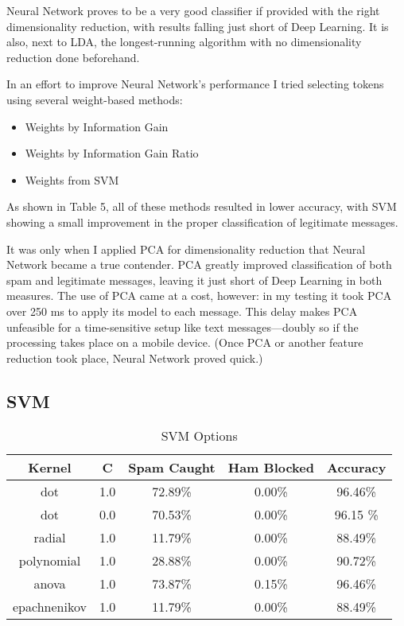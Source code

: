 \documentclass[10pt,journal,compsoc]{IEEEtran}
\begin{document}
Neural Network proves to be a very good classifier if provided with the right dimensionality reduction, with results falling just short of Deep Learning. It is also, next to LDA, the longest-running algorithm with no dimensionality reduction done beforehand.

In an effort to improve Neural Network's performance I tried selecting tokens using several weight-based methods: 

\begin{itemize}
    \item Weights by Information Gain
    \item Weights by Information Gain Ratio
    \item Weights from SVM
\end{itemize}

As shown in Table 5, all of these methods resulted in lower accuracy, with SVM showing a small improvement in the proper classification of legitimate messages.

It was only when I applied PCA for dimensionality reduction that Neural Network became a true contender. PCA greatly improved classification of both spam and legitimate messages, leaving it just short of Deep Learning in both measures. The use of PCA came at a cost, however: in my testing it took PCA over 250 ms to apply its model to each message. This delay makes PCA unfeasible for a time-sensitive setup like text messages---doubly so if the processing takes place on a mobile device. (Once PCA or another feature reduction took place, Neural Network proved quick.)

\subsection{SVM}

\begin{table}[!t]
\renewcommand{\arraystretch}{1.3}
\caption{SVM Options}
\label{Table 6}
\centering
\begin{tabular}{|c|c|c|c|c|}
\hline
Kernel & C & Spam Caught & Ham Blocked & Accuracy \\ \hline
dot & 1.0 & 72.89\% & 0.00\% & 96.46\% \\ \hline
dot & 0.0 & 70.53\% & 0.00\% & 96.15 \% \\ \hline
radial & 1.0 & 11.79\% & 0.00\% & 88.49\% \\ \hline
polynomial & 1.0 & 28.88\% & 0.00\% & 90.72\% \\ \hline
anova & 1.0 & 73.87\% & 0.15\% & 96.46\% \\ \hline
epachnenikov & 1.0 & 11.79\% & 0.00\% & 88.49\% \\ \hline
\end{tabular}
\end{table}
\end{document}
